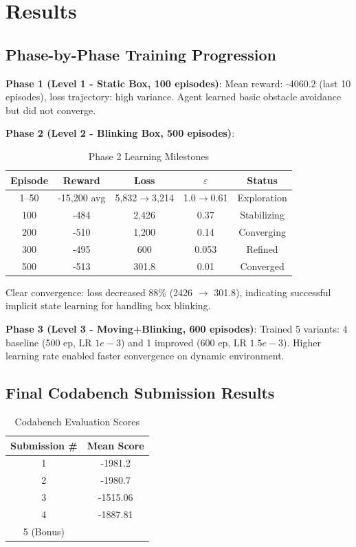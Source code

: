 \documentclass[12pt,a4paper]{article}
\begin{document}
\section{Results}

\subsection{Phase-by-Phase Training Progression}

\textbf{Phase 1 (Level 1 - Static Box, 100 episodes)}:
Mean reward: -4060.2 (last 10 episodes), loss trajectory: high variance. Agent learned basic obstacle avoidance but did not converge.

\textbf{Phase 2 (Level 2 - Blinking Box, 500 episodes)}:

\begin{table}[H]
\centering
\caption{Phase 2 Learning Milestones}
\begin{tabular}{|c|c|c|c|c|}
\hline
\textbf{Episode} & \textbf{Reward} & \textbf{Loss} & \textbf{$\varepsilon$} & \textbf{Status} \\
\hline
1--50 & -15,200 avg & 5,832$\to$3,214 & 1.0$\to$0.61 & Exploration \\
\hline
100 & -484 & 2,426 & 0.37 & Stabilizing \\
\hline
200 & -510 & 1,200 & 0.14 & Converging \\
\hline
300 & -495 & 600 & 0.053 & Refined \\
\hline
500 & -513 & 301.8 & 0.01 & Converged \\
\hline
\end{tabular}
\end{table}

Clear convergence: loss decreased 88\% (2426 $\to$ 301.8), indicating successful implicit state learning for handling box blinking.

\textbf{Phase 3 (Level 3 - Moving+Blinking, 600 episodes)}:
Trained 5 variants: 4 baseline (500 ep, LR $1e-3$) and 1 improved (600 ep, LR $1.5e-3$). Higher learning rate enabled faster convergence on dynamic environment.

\subsection{Final Codabench Submission Results}

\begin{table}[H]
\centering
\caption{Codabench Evaluation Scores}
\begin{tabular}{|c|c|}
\hline
\textbf{Submission \#} & \textbf{Mean Score} \\
\hline
1 & -1981.2 \\
\hline
2 & -1980.7 \\
\hline
3 & -1515.06 \\
\hline
4 & -1887.81 \\
\hline
5 (Bonus) & \underline{\hspace{5cm}} \\
\hline
\end{tabular}
\end{table}
\end{document}
